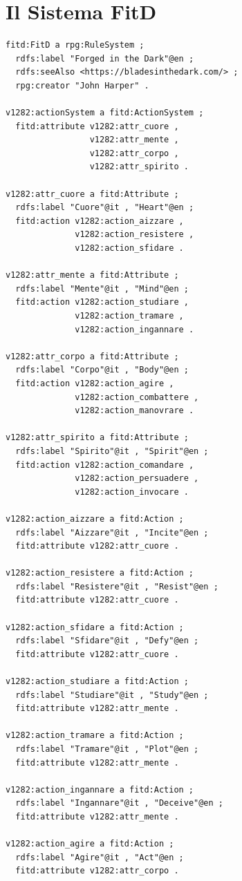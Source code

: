 \section{Il Sistema FitD}

\begin{verbatim}
fitd:FitD a rpg:RuleSystem ;
  rdfs:label "Forged in the Dark"@en ;
  rdfs:seeAlso <https://bladesinthedark.com/> ;
  rpg:creator "John Harper" .

v1282:actionSystem a fitd:ActionSystem ;
  fitd:attribute v1282:attr_cuore ,
                 v1282:attr_mente ,
                 v1282:attr_corpo ,
                 v1282:attr_spirito .

v1282:attr_cuore a fitd:Attribute ;
  rdfs:label "Cuore"@it , "Heart"@en ;
  fitd:action v1282:action_aizzare ,
              v1282:action_resistere ,
              v1282:action_sfidare .

v1282:attr_mente a fitd:Attribute ;
  rdfs:label "Mente"@it , "Mind"@en ;
  fitd:action v1282:action_studiare ,
              v1282:action_tramare ,
              v1282:action_ingannare .

v1282:attr_corpo a fitd:Attribute ;
  rdfs:label "Corpo"@it , "Body"@en ;
  fitd:action v1282:action_agire ,
              v1282:action_combattere ,
              v1282:action_manovrare .

v1282:attr_spirito a fitd:Attribute ;
  rdfs:label "Spirito"@it , "Spirit"@en ;
  fitd:action v1282:action_comandare ,
              v1282:action_persuadere ,
              v1282:action_invocare .

v1282:action_aizzare a fitd:Action ;
  rdfs:label "Aizzare"@it , "Incite"@en ;
  fitd:attribute v1282:attr_cuore .

v1282:action_resistere a fitd:Action ;
  rdfs:label "Resistere"@it , "Resist"@en ;
  fitd:attribute v1282:attr_cuore .

v1282:action_sfidare a fitd:Action ;
  rdfs:label "Sfidare"@it , "Defy"@en ;
  fitd:attribute v1282:attr_cuore .

v1282:action_studiare a fitd:Action ;
  rdfs:label "Studiare"@it , "Study"@en ;
  fitd:attribute v1282:attr_mente .

v1282:action_tramare a fitd:Action ;
  rdfs:label "Tramare"@it , "Plot"@en ;
  fitd:attribute v1282:attr_mente .

v1282:action_ingannare a fitd:Action ;
  rdfs:label "Ingannare"@it , "Deceive"@en ;
  fitd:attribute v1282:attr_mente .

v1282:action_agire a fitd:Action ;
  rdfs:label "Agire"@it , "Act"@en ;
  fitd:attribute v1282:attr_corpo .


\end{verbatim}
